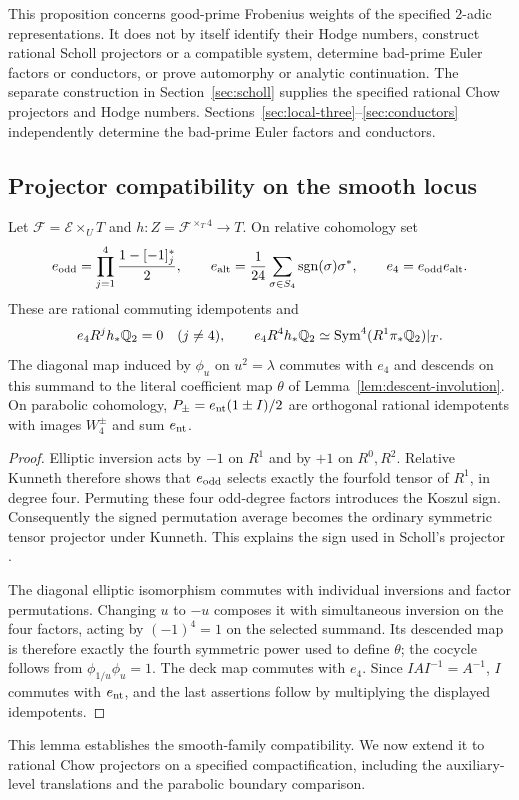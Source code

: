 \begin{remark}
This proposition concerns good-prime Frobenius weights of the
specified $2$-adic representations. It does not by itself
identify their Hodge numbers, construct rational Scholl
projectors or a compatible system, determine bad-prime Euler
factors or conductors, or prove automorphy or analytic
continuation. The separate construction in Section~\ref{sec:scholl}
supplies the specified rational Chow projectors and Hodge numbers.
Sections~\ref{sec:local-three}--\ref{sec:conductors} independently determine
the bad-prime Euler factors and conductors.
\end{remark}


\subsection{Projector compatibility on the smooth locus}
\begin{lemma}\label{lem:open-projectors}
Let $\mathcal F=\mathcal E\times_U T$ and
$h:Z=\mathcal F^{\times_T4}\to T$. On relative cohomology set
\[
 e_{\rm odd}=\prod_{j=1}^4\frac{1-[-1]_j^*}{2},\qquad
 e_{\rm alt}=\frac1{24}\sum_{\sigma\in S_4}\operatorname{sgn}(\sigma)\sigma^*,
 \qquad e_4=e_{\rm odd}e_{\rm alt}.
\]
These are rational commuting idempotents and
\[
 e_4R^j h_*\mathbb Q_2=0\quad(j\ne4),\qquad
 e_4R^4h_*\mathbb Q_2\simeq\operatorname{Sym}^4(R^1\pi_*\mathbb Q_2)|_T.
\]
The diagonal map induced by $\phi_u$ on $u^2=\lambda$ commutes with
$e_4$ and descends on this summand to the literal coefficient map
$\theta$ of Lemma~\ref{lem:descent-involution}. On parabolic cohomology,
$P_\pm=e_{\rm nt}(1\pm I)/2$ are orthogonal rational idempotents
with images $W_4^\pm$ and sum $e_{\rm nt}$.
\end{lemma}
\begin{proof}
Elliptic inversion acts by $-1$ on $R^1$ and by $+1$ on $R^0,R^2$.
Relative Kunneth therefore shows that $e_{\rm odd}$ selects exactly
the fourfold tensor of $R^1$, in degree four. Permuting these four
odd-degree factors introduces the Koszul sign. Consequently the signed
permutation average becomes the ordinary symmetric tensor projector
under Kunneth. This explains the sign used in Scholl's projector
\cite[Section~1.1.2]{SchollMotives}.

The diagonal elliptic isomorphism commutes with individual inversions
and factor permutations. Changing $u$ to $-u$ composes it with
simultaneous inversion on the four factors, acting by $(-1)^4=1$
on the selected summand. Its descended map is therefore exactly the
fourth symmetric power used to define $\theta$; the cocycle follows
from $\phi_{1/u}\phi_u=1$. The deck map commutes with $e_4$.
Since $IAI^{-1}=A^{-1}$, $I$ commutes with $e_{\rm nt}$, and the
last assertions follow by multiplying the displayed idempotents.
\end{proof}

This lemma establishes the smooth-family compatibility. We now extend it
to rational Chow projectors on a specified compactification, including the
auxiliary-level translations and the parabolic boundary comparison.
